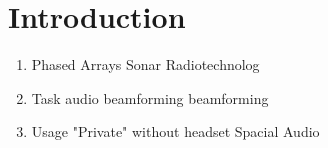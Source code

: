 \chapter{Introduction}

\begin{enumerate}
  \item Phased Arrays
  \subitem Sonar
  \subitem Radiotechnolog
  \item Task
  \subitem audio beamforming
  \subitem beamforming
  \item Usage
  \subitem "Private" without headset
  \subitem Spacial Audio
\end{enumerate}